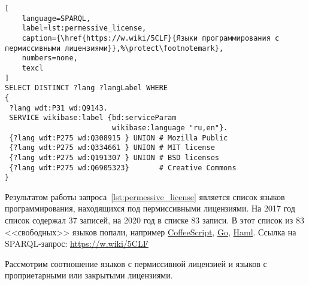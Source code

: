 \begin{marginfigure}[-22\baselineskip]
\begin{lstlisting}[
	language=SPARQL,
	label=lst:permessive_license,
    caption={\href{https://w.wiki/5CLF}{Языки программирования с пермиссивными лицензиями}},%\protect\footnotemark},
    numbers=none,
	texcl
]
SELECT DISTINCT ?lang ?langLabel WHERE
{
 ?lang wdt:P31 wd:Q9143.
 SERVICE wikibase:label {bd:serviceParam 
                         wikibase:language "ru,en"}.
 {?lang wdt:P275 wd:Q308915 } UNION # Mozilla Public
 {?lang wdt:P275 wd:Q334661 } UNION # MIT license
 {?lang wdt:P275 wd:Q191307 } UNION # BSD licenses
 {?lang wdt:P275 wd:Q6905323}       # Creative Commons
}
\end{lstlisting}
Результатом работы запроса~\ref{lst:permessive_license} является список языков программирования, находящихся под пермиссивными лицензиями. На 2017 год список содержал 37 записей, на 2020 год в списке 83 записи. В этот список из 83 <<свободных>>  языков попали, например \href{https://ru.wikipedia.org/wiki/CoffeeScript}{CoffeeScript}, \href{https://ru.wikipedia.org/wiki/Go}{Go}, \href{https://ru.wikipedia.org/wiki/Haml}{Haml}. Ссылка на SPARQL-запрос: \href{https://w.wiki/5CLF}{https://w.wiki/5CLF}
\end{marginfigure}



\newpage
Рассмотрим соотношение языков с пермиссивной лицензией и языков с проприетарными или закрытыми лицензиями.

